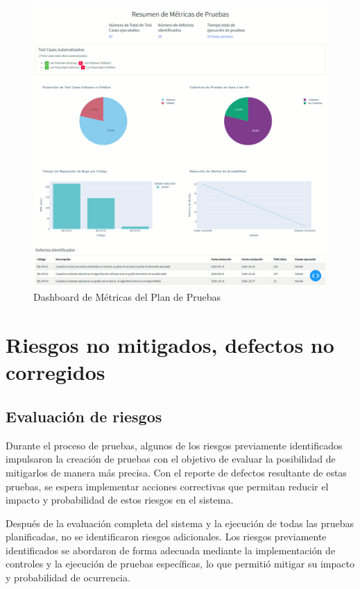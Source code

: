 \documentclass[stu, 12pt, letterpaper, donotrepeattitle, floatsintext, natbib]{apa7}
\begin{document}
\begin{figure}[H]
    \label{fig:dashboard_metrica_pruebas}
    \centering
    \includegraphics[width=\textwidth]{../imgs/new_dashboard.png}
    \caption{Dashboard de Métricas del Plan de Pruebas}
\end{figure}


\newpage
\section{\large Riesgos no mitigados, defectos no corregidos}

\subsection{Evaluación de riesgos} 

\noindent Durante el proceso de pruebas, algunos de los riesgos previamente identificados impulsaron la creación de pruebas con el objetivo de evaluar la posibilidad de mitigarlos de manera más precisa. Con el reporte de defectos resultante de estas pruebas, se espera implementar acciones correctivas que permitan reducir el impacto y probabilidad de estos riesgos en el sistema.

\noindent Después de la evaluación completa del sistema y la ejecución de todas las pruebas planificadas, no se identificaron riesgos adicionales. Los riesgos previamente identificados se abordaron de forma adecuada mediante la implementación de controles y la ejecución de pruebas específicas, lo que permitió mitigar su impacto y probabilidad de ocurrencia.
\end{document}
